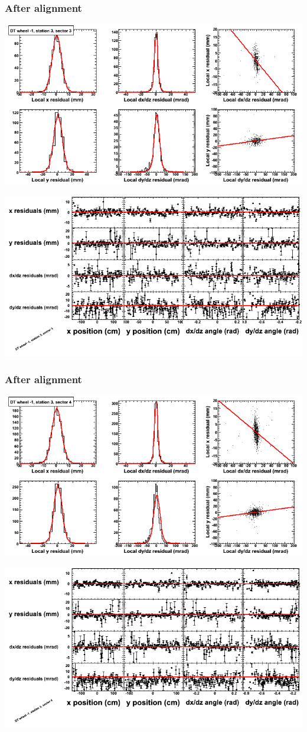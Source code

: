 \documentclass[compress]{beamer}
\begin{document}
\begin{frame}
\frametitle{After alignment}
\includegraphics[width=0.7\linewidth]{NOV4_fitfunctions/MBwhBst3sec03_bellcurves.png}

\includegraphics[width=0.7\linewidth]{NOV4_fitfunctions/MBwhBst3sec03_polynomials.png}
\end{frame}

\begin{frame}
\frametitle{After alignment}
\includegraphics[width=0.7\linewidth]{NOV4_fitfunctions/MBwhBst3sec04_bellcurves.png}

\includegraphics[width=0.7\linewidth]{NOV4_fitfunctions/MBwhBst3sec04_polynomials.png}
\end{frame}
\end{document}
